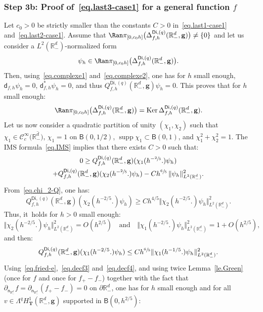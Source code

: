 \documentclass[10pt]{amsart}
\newcommand{\quand}{\quad\text{and}\quad}
\newcommand{\mbf}[1]{\mathbf{#1}}
\let\pa\partial
\DeclareMathOperator\Ker{Ker}
\DeclareMathOperator\supp{supp}
\theoremstyle{plain}
\theoremstyle{definition}
\begin{document}
\subsubsection*{Step 3b: Proof of~\eqref{eq.last3-case1} for a general
function $f$}
Let $c_0>0$ be strictly smaller than the constants $C>0$ in~\eqref{eq.last1-case1} and~\eqref{eq.last2-case1}.
Assume that $\Ran \pi _{[0,c_0h]}\bigl(\Delta_{f,h}^{\mathsf{Di},(q)}(\mathbb R_-^d, \mbf g) \bigr) \neq \{0\}$ and let us consider a $L^2(\mathbb R_-^d) $-normalized form
\[
\psi_h\in \Ran \pi _{[0,c_0h]}\bigl(\Delta_{f,h}^{\mathsf{Di},(q)}(\mathbb R_-^d, \mbf g) \bigr).
\]
Then, using~\eqref{eq.complexe1} and~\eqref{eq.complexe2}, one has for $h$ small enough,
$\mathsf d_{f,h}\psi_h= 0$, $\mathsf d_{f,h}^*\psi_h=0$, and thus $Q_{f,h}^{\mathsf{Di},(q)}(\mathbb R_-^d, \mbf g) \psi_h=0$.
This proves that for $h$ small enough:
\[
\Ran \pi_{[0,c_0h]}\bigl(\Delta_{f,h}^{\mathsf{Di},(q)}(\mathbb R_-^d, {\mbf g})\bigr)=\Ker \Delta_{f,h}^{\mathsf{Di},(q)}(\mathbb R_-^d, {\mbf g}).
\]
Let us now consider a quadratic partition of unity $(\chi_1,\chi_2)$ such that $\chi_1\in\mathcal C_c^\infty (\overline {\mathbb R_-^d)}$, $\chi_1=1$ on $\mathsf B(0,1/2)$, $\supp \chi_1\subset \mathsf B(0,1)$, and $\chi_1^2+\chi_2^2=1$.
The IMS formula~\eqref{eq.IMS}
implies that there exists $C>0$ such that:
\begin{multline}
\label{eq.ast1}
0\ge Q_{f,h}^{\mathsf{Di},(q)}(\mathbb R_-^d, \mbf g)
(\chi_1(h^{-\sfrac 25}.) \psi_h)\\
+Q_{f,h}^{\mathsf{Di},(q)}(\mathbb R^d_-, \mbf g)(\chi_2(h^{-\sfrac 25}.) \psi_h) -C h^{\sfrac 65}\, \Vert \psi_h \Vert_{L^2(\mathbb R_-^d)}^2.
\end{multline}
From~\eqref{eq.chi_2-Q}, one has:
\[
Q_{f,h}^{\mathsf{Di},(q)}(\mathbb R^d_-, \mbf g)(\chi_2(h^{-2/5 }.) \psi_h)\ge Ch^{4/5} \Vert \chi_2(h^{-2/5 }.) \psi_h \Vert_{L^2(\mathbb R_-^d)}^2.
\]
Thus, it~holds for $h>0$ small enough:
\begin{equation}\label{norme-chi}
\Vert \chi_2(h^{-2/5 }.) \psi_h \Vert_{L^2(\mathbb R_-^d)}^2 =O(h^{2/5 }) \quand \Vert \chi_1(h^{-2/5 }.) \psi_h \Vert_{L^2(\mathbb R_-^d)}^2=1+O (h^{2/5 }),
\end{equation}
and then:
\begin{equation}\label{quad-chi1}
Q_{f,h}^{\mathsf{Di},(q)}(\mathbb R^d_-, { \mbf g}) (\chi_1(h^{-2/5 }.) \psi_h)\le Ch^{\sfrac 65} \Vert \chi_1(h^{-1/5 }.) \psi_h \Vert_{L^2(\mathbb R_-^d)}^2.
\end{equation}
Using~\eqref{eq.fried-e},~\eqref{eq.decf3} and~\eqref{eq.decf4}, and using twice Lemma~\ref{le.Green} (once for $f$ and once for $f_+-f_-$) together with the fact that $ \partial_{\mathsf n_{\mathbb R^d_-}}f= \partial_{\mathsf n_{\mathbb R^d_-}}(f_+-f_-)=0$ on $\pa \mathbb R^d_-$, one has for $h$ small enough and for all $v\in \Lambda^qH^1_{\mbf T}(\mathbb R^d_-, \mbf g) $ supported in $\mathsf B(0,h^{2/5})$:
\end{document}
